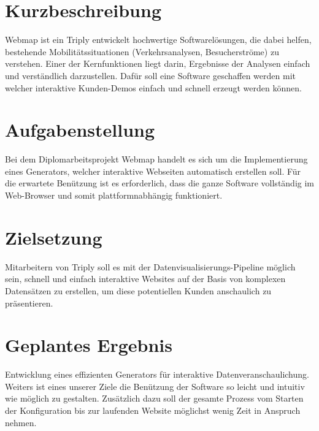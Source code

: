\section{Kurzbeschreibung}
Webmap ist ein
Triply entwickelt hochwertige Softwarelösungen, die dabei helfen, bestehende Mobilitätssituationen (Verkehrsanalysen,
Besucherströme) zu verstehen. Einer der Kernfunktionen liegt darin, Ergebnisse der Analysen einfach und verständlich
darzustellen. Dafür soll eine Software geschaffen werden mit welcher interaktive Kunden-Demos einfach und schnell
erzeugt werden können.

\section{Aufgabenstellung}
Bei dem Diplomarbeitsprojekt Webmap handelt es sich um die Implementierung eines Generators, welcher interaktive
Webseiten automatisch erstellen soll. Für die erwartete Benützung ist es erforderlich, dass die ganze Software
vollständig im Web-Browser und somit plattformnabhängig funktioniert.

\section{Zielsetzung}
Mitarbeitern von Triply soll es mit der Datenvisualisierungs-Pipeline möglich sein, schnell und einfach
interaktive Websites auf der Basis von komplexen Datensätzen zu erstellen, um diese potentiellen Kunden
anschaulich zu präsentieren.

\section{Geplantes Ergebnis}
Entwicklung eines effizienten Generators für interaktive Datenveranschaulichung. Weiters ist eines unserer Ziele
die Benützung der Software so leicht und intuitiv wie möglich zu gestalten. Zusätzlich dazu soll der gesamte
Prozess vom Starten der Konfiguration bis zur laufenden Website möglichst wenig Zeit in Anspruch nehmen.